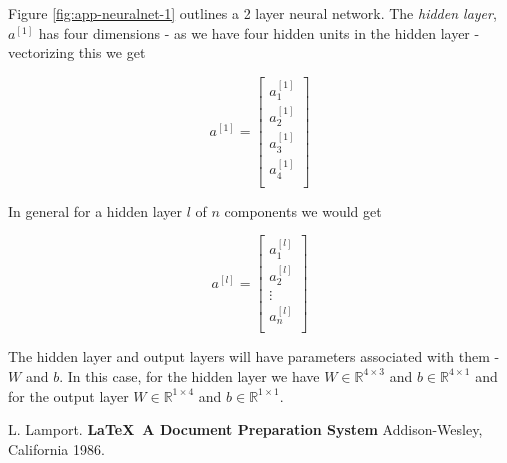 \documentclass[12pt,reqno]{book}      %
\def\R{\mathbb{ R}}
\begin{document}
Figure \ref{fig:app-neuralnet-1} outlines a 2 layer neural network. The \textit{hidden layer}, $a^{[1]}$ has four dimensions - as we have four hidden units in the hidden layer - vectorizing this we get

\[
a^{[1]} =  \begin{bmatrix}
	a^{[1]}_1 \\
	a^{[1]}_2 \\
	a^{[1]}_3 \\	
	a^{[1]}_4 \\
\end{bmatrix}
\]

In general for a hidden layer $l$ of $n$ components we would get

\[
a^{[l]} =  \begin{bmatrix}
	a^{[l]}_1 \\
	a^{[l]}_2 \\
	\vdots \\
	a^{[l]}_n \\
\end{bmatrix}
\]

The hidden layer and output layers will have parameters associated with them - $W$ and $b$. In this case, for the hidden layer we have $W \in \R^{4 \times 3}$ and $b \in \R^{4 \times 1}$ and for the output layer $W \in \R^{1 \times 4}$ and $b \in \R^{1 \times 1}$.



\pagestyle{headings}




\begin{thebibliography}{99}
 L. Lamport. {\bf \LaTeX \ A Document Preparation System}
Addison-Wesley, California 1986.
\end{thebibliography}


\end{document}
